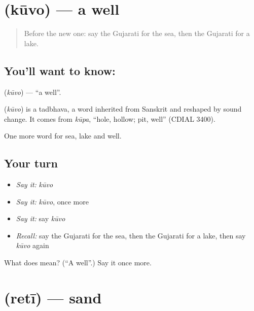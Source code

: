 \section[\texorpdfstring{\gu{કૂવો} (kūvo)}{કૂવો (kūvo)}]{ (kūvo) — a well}

\label{lesson:GU-C65-well}



\begin{quote}
Before the new one: say the Gujarati for the sea, then the Gujarati for a lake.
\end{quote}

\subsection*{You'll want to know: }
\textbf{} (\emph{kūvo}) — \textquotedblleft{}a well\textquotedblright{}.

\begin{cousinweb}
\textbf{} (\emph{kūvo}) is a tadbhava, a word inherited from Sanskrit and reshaped by sound change. It comes from \emph{kūpa}, \textquotedblleft{}hole, hollow; pit, well\textquotedblright{} (CDIAL 3400).
\end{cousinweb}

\begin{grammarlens}[title={What you've built}]
One more word for sea, lake and well.
\end{grammarlens}

\subsection*{Your turn}
\begin{itemize}
\raggedright
  \item \emph{Say it:} \emph{kūvo}
  \item \emph{Say it:} \emph{kūvo}, once more
  \item \emph{Say it:} say \emph{kūvo}
  \item \emph{Recall:} say the Gujarati for the sea, then the Gujarati for a lake, then say \emph{kūvo} again
\end{itemize}

\begin{tcolorbox}[breakable,colback=teal!4,colframe=teal!35!black,title={Before you move on}]
What does  mean? (\textquotedblleft{}A well\textquotedblright{}.) Say it once more.
\end{tcolorbox}
\section[\texorpdfstring{\gu{રેતી} (retī)}{રેતી (retī)}]{ (retī) — sand}

